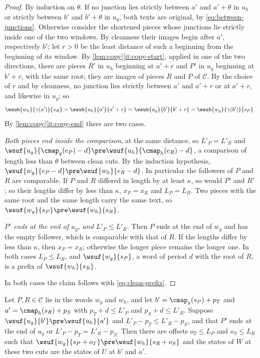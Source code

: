 \begin{proof}
By induction on $\theta$. If no junction lies strictly between $a'$ and $a'+\theta$ in
$u_h$ or strictly between $b'$ and $b'+\theta$ in $u_g$, both texts are original,
by \eqref{eq:between-junctions}. Otherwise consider the shortened pieces
whose junctions lie strictly inside one of the two windows. By cleanness
their images begin after $a'$, respectively $b'$; let $r>0$ be the least
distance of such a beginning from the beginning of its window. By
\cref{lem:copy}\eqref{it:copy-start}, applied in one of the two directions,
there are pieces $R'$ in $u_h$ beginning at $a'+r$ and $P'$ in $u_g$
beginning at $b'+r$, with the same root; they are images of pieces $R$ and
$P$ of $\mathcal C$. By the choice of $r$ and by cleanness, no junction lies
strictly between $a'$ and $a'+r$ or at $a'+r$, and likewise in $u_g$; so
\begin{equation}\label{eq:clean-prefix}
  \wsub{w_h}{\gamma(a')}{s_R}=\wsub{u_h}{a'}{a'+r}=\wsub{u_g}{b'}{b'+r}=
  \wsub{w_g}{\gamma(b')}{s_P}.
\end{equation}
By \cref{lem:copy}\eqref{it:copy-end} there are two cases.

\emph{Both pieces end inside the comparison}, at the same distance, so
$L'_P=L'_R$ and $\wsuf{u_g}{\cmap_g(e_P)-d}\pre\wsuf{u_h}{\cmap_h(e_R)-d}$,
a comparison of length less than $\theta$ between clean cuts. By the induction
hypothesis, $\wsuf{w_g}{e_P-d}\pre\wsuf{w_h}{e_R-d}$. In particular the
followers of $P$ and $R$ are comparable. If $P$ and $R$ differed in length
by at least $\kappa$, so would $P'$ and $R'$; so their lengths differ by
less than $\kappa$, $x_P=x_R$ and $L_P=L_R$. Two pieces with the same root
and the same length carry the same text, so
$\wsuf{w_g}{s_P}\pre\wsuf{w_h}{s_R}$.

\emph{$P'$ ends at the end of $u_g$, and $L'_P\le L'_R$.} Then $P$ ends at
the end of $w_g$ and has the empty follower, which is comparable with that
of $R$. If the lengths differ by less than $\kappa$, then $x_P=x_R$;
otherwise the longer piece remains the longer one. In both cases $L_P\le
L_R$, and $\wsuf{w_g}{s_P}$, a word of period $d$ with the root of $R$, is a
prefix of $\wsuf{w_h}{s_R}$.

In both cases the claim follows with \eqref{eq:clean-prefix}.
\end{proof}

\begin{lemma}\label{lem:inside}
Let $P,R\in\mathcal C$ lie in the words $w_g$ and $w_h$, and let
$b'=\cmap_g(s_P)+p_T$ and $a'=\cmap_h(s_R)+p_S$ with $p_T+d\le L'_P$ and
$p_S+d\le L'_R$. Suppose $\wsuf{u_g}{b'}\pre\wsuf{u_h}{a'}$ and
$L'_P-p_T\le L'_R-p_S$, and that $P'$ ends at the end of $u_g$ or
$L'_P-p_T=L'_R-p_S$. Then there are offsets $o_T\le L_P$ and $o_S\le L_R$
such that $\wsuf{w_g}{s_P+o_T}\pre\wsuf{w_h}{s_R+o_S}$ and the states of $W$
at these two cuts are the states of $U$ at $b'$ and $a'$.
\end{lemma}

